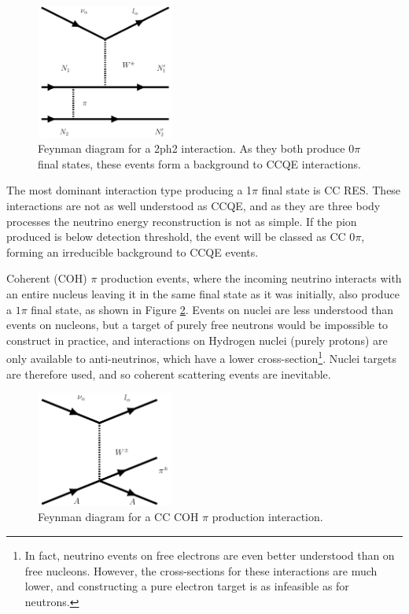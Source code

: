 \begin{figure}[!htbp]
\vspace{20pt}
\centering
\includegraphics*[width=0.4\textwidth,clip]{figs/feynman2p2h}
\caption{Feynman diagram for a 2ph2 interaction. As they both produce 0$\pi$ final states, these events form a background to CCQE interactions.
} \label{2p2hdiagram}
\end{figure}

The most dominant interaction type producing a 1$\pi$ final state is CC RES. These interactions are not as well understood as CCQE, and as they are three body processes the neutrino energy reconstruction is not as simple. If the pion produced is below detection threshold, the event will be classed as CC 0$\pi$, forming an irreducible background to CCQE events. 

Coherent (COH) $\pi$ production events, where the incoming neutrino interacts with an entire nucleus leaving it in the same final state as it was initially, also produce a $1\pi$ final state, as shown in Figure \ref{COHdiagram}. Events on nuclei are less understood than events on nucleons, but a target of purely free neutrons would be impossible to construct in practice, and interactions on Hydrogen nuclei (purely protons) are only available to anti-neutrinos, which have a lower cross-section\footnote{In fact, neutrino events on free electrons are even better understood than on free nucleons. However, the cross-sections for these interactions are much lower, and constructing a pure electron target is as infeasible as for neutrons.}. Nuclei targets are therefore used, and so coherent scattering events are inevitable.

\begin{figure}[!htbp]
\vspace{20pt}
\centering
\includegraphics*[width=0.4\textwidth,clip]{figs/feynmanCOH}
\caption{Feynman diagram for a CC COH $\pi$ production interaction. 
} \label{COHdiagram}
\end{figure}

